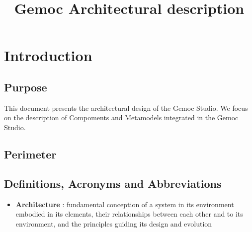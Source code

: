 \documentclass{gemoc} %
\title{Gemoc Architectural description}
\begin{document}
\maketitle

\begin{revisions}
	\begin{revtable}
		\dates{}{}{}{}{}
		\writers{}{}{}{}{}
		\approvers{}{}{}{}{}
	\end{revtable}
	\begin{revisionlabels}
		\revlabel{}
	\end{revisionlabels}
\end{revisions}

\begin{tableofauthors}
\end{tableofauthors}

\tableofcontents
\newpage

\chapter{Introduction}


\section{Purpose}
This document presents the architectural design of the Gemoc Studio. We focus on 
the description of  Compoments and Metamodels integrated in the Gemoc Studio.

\section{Perimeter}


\section{Definitions, Acronyms and Abbreviations}
\begin{itemize}
	\item \textbf{Architecture}  : fundamental conception of a system in its environment
 embodied in its elements, their relationships between each other and to its 
environment, and the principles guiding its design and evolution
\end{itemize}
\end{document}
